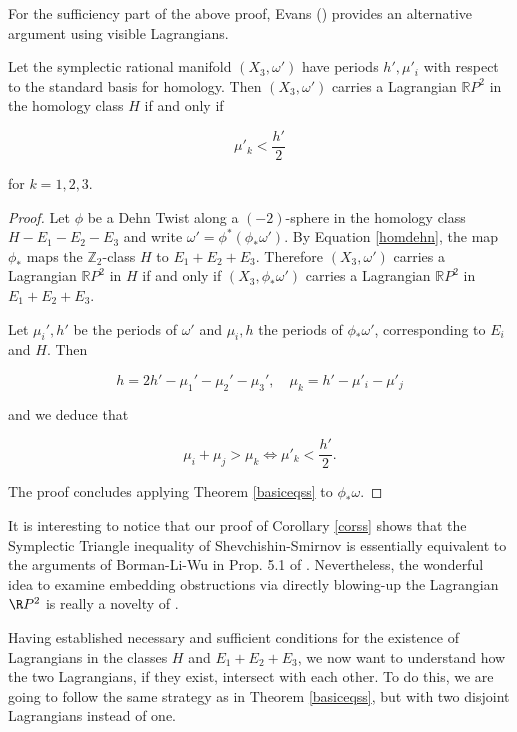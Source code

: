 \begin{remark}
For the sufficiency part of the above proof, Evans (\cite{EKb}) provides an alternative argument using visible Lagrangians.
\end{remark}

\begin{corollary}\label{corss}
Let the symplectic rational manifold $(X_3,\omega')$ have periods $h',\mu'_i$ with respect to the standard basis for homology. Then $(X_3,\omega')$ carries a Lagrangian $\mathbb{R}P^2$ in the homology class $H$ if and only if 

\[\mu'_k<\frac{h'}{2}\]

for $k=1,2,3$.

\end{corollary}

\begin{proof}
Let $\phi$ be a Dehn Twist along a $(-2)$-sphere in the homology class $H-E_1-E_2-E_3$ and write $\omega'=\phi^*(\phi_*\omega')$. By Equation \ref{homdehn}, the map $\phi_*$ maps the $\mathbb{Z}_2$-class $H$ to $E_1+E_2+E_3$. Therefore $(X_3,\omega')$ carries a Lagrangian $\mathbb{R}P^2$ in $H$ if and only if $(X_3,\phi_*\omega')$ carries a Lagrangian $\mathbb{R}P^2$ in $E_1+E_2+E_3$. 

Let $\mu_i',h'$ be the periods of $\omega'$ and $\mu_i,h$ the periods of $\phi_*\omega'$, corresponding to $E_i$ and $H$. Then

\[h=2h'-\mu_1'-\mu_2'-\mu_3',\quad \mu_k=h'-\mu'_i-\mu'_j\]

and we deduce that

\[\mu_i+\mu_j>\mu_k\Leftrightarrow \mu'_k<\frac{h'}{2}.\]

The proof concludes applying Theorem \ref{basiceqss} to $\phi_*\omega$. 

\end{proof}




\begin{remark}
It is interesting to notice that our proof of Corollary \ref{corss} shows that the Symplectic Triangle inequality of Shevchishin-Smirnov is essentially equivalent to the arguments of Borman-Li-Wu in Prop. 5.1 of \cite{BLW}. Nevertheless, the wonderful idea to examine embedding obstructions via directly blowing-up the Lagrangian $\R P^2$ is really a novelty of \cite{SS}.
\end{remark}



Having established necessary and sufficient conditions for the existence of Lagrangians in the classes $H$ and $E_1+E_2+E_3$, we now want to understand how the two Lagrangians, if they exist, intersect with each other. To do this, we are going to follow the same strategy as in Theorem \ref{basiceqss}, but with two disjoint Lagrangians instead of one.




